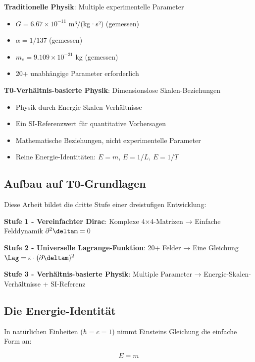 	\begin{tcolorbox}[colback=red!5!white,colframe=red!75!black,title=Gegenüberstellung]
		\textbf{Traditionelle Physik}: Multiple experimentelle Parameter
		\begin{itemize}
			\item $G = 6.67 \times 10^{-11}$ m³/(kg·s²) (gemessen)
			\item $\alpha = 1/137$ (gemessen)
			\item $m_e = 9.109 \times 10^{-31}$ kg (gemessen)
			\item 20+ unabhängige Parameter erforderlich
		\end{itemize}
		
		\textbf{T0-Verhältnis-basierte Physik}: Dimensionslose Skalen-Beziehungen
		\begin{itemize}
			\item Physik durch Energie-Skalen-Verhältnisse
			\item Ein SI-Referenzwert für quantitative Vorhersagen
			\item Mathematische Beziehungen, nicht experimentelle Parameter
			\item Reine Energie-Identitäten: $E = m$, $E = 1/L$, $E = 1/T$
		\end{itemize}
	\end{tcolorbox}
	
	\subsection{Aufbau auf T0-Grundlagen}
	
	Diese Arbeit bildet die dritte Stufe einer dreistufigen Entwicklung:
	
	\textbf{Stufe 1 - Vereinfachter Dirac}: Komplexe 4×4-Matrizen → Einfache Felddynamik $\partial^2 \deltam = 0$
	
	\textbf{Stufe 2 - Universelle Lagrange-Funktion}: 20+ Felder → Eine Gleichung $\Lag = \varepsilon \cdot (\partial \deltam)^2$
	
	\textbf{Stufe 3 - Verhältnis-basierte Physik}: Multiple Parameter → Energie-Skalen-Verhältnisse + SI-Referenz
	
	\subsection{Die Energie-Identität}
	
	In natürlichen Einheiten ($\hbar = c = 1$) nimmt Einsteins Gleichung die einfache Form an:
	
	\begin{equation}
		\boxed{E = m}
		\label{eq:energy_mass_identity}
	\end{equation}
	
